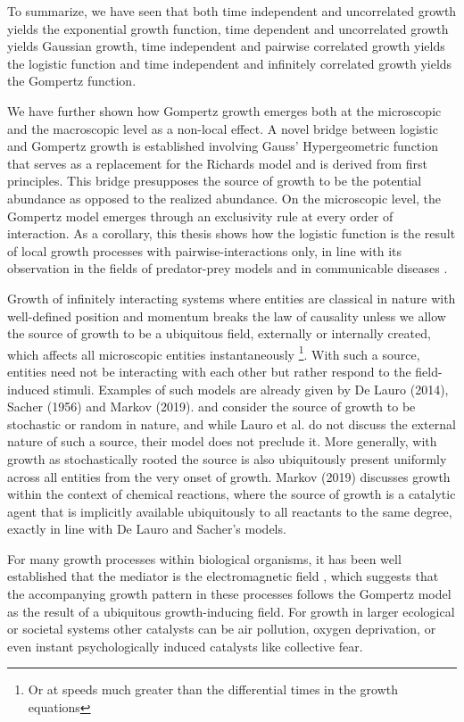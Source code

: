 \documentclass{article}
\begin{document}
To summarize, we have seen that both time independent and uncorrelated growth yields the exponential growth function, time dependent and uncorrelated growth yields Gaussian growth, time independent and pairwise correlated growth yields the logistic function and time independent and infinitely correlated growth yields the Gompertz function. 

We have further shown how Gompertz growth emerges both at the microscopic and the macroscopic level as a non-local effect. A novel bridge between logistic and Gompertz growth is established involving Gauss' Hypergeometric function that serves as a replacement for the Richards model and is derived from first principles. This bridge presupposes the source of growth to be the potential abundance as opposed to the realized abundance. On the microscopic level, the Gompertz model emerges through an exclusivity rule at every order of interaction. As a corollary, this thesis shows how the logistic function is the result of local growth processes with pairwise-interactions only, in line with its observation in the fields of predator-prey models and in communicable diseases \cite{may2007theoretical}. 

Growth of infinitely interacting systems where entities are classical in nature with well-defined position and momentum breaks the law of causality unless we allow the source of growth to be a ubiquitous field, externally or internally created, which affects all microscopic entities instantaneously \footnote{Or at speeds much greater than the differential times in the growth equations}. With such a source, entities need not be interacting with each other but rather respond to the field-induced stimuli. Examples of such models are already given by De Lauro (2014), Sacher (1956) and Markov (2019). \citet{de2014stochastic} and \citet{sacher1956statistical} consider the source of growth to be stochastic or random in nature, and while Lauro et al. do not discuss the external nature of such a source, their model does not preclude it. More generally, with growth as stochastically rooted the source is also ubiquitously present uniformly across all entities from the very onset of growth. Markov (2019)\cite{markov2019reaction} discusses growth within the context of chemical reactions, where the source of growth is a catalytic agent that is implicitly available ubiquitously to all reactants to the same degree, exactly in line with De Lauro and Sacher's models. 

For many growth processes within biological organisms, it has been well established that the mediator is the electromagnetic field \cite{becker1984electromagnetic}, which suggests that the accompanying growth pattern in these processes follows the Gompertz model as the result of a ubiquitous growth-inducing field. For growth in larger ecological or societal systems other catalysts can be air pollution, oxygen deprivation, or even instant psychologically induced catalysts like collective fear. 
\end{document}
